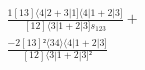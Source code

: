 \documentclass[varwidth, border=5pt]{standalone}
\begin{document}
\begin{my}
$\begin{gathered}
\scriptscriptstyle\frac{1[13]⟨4|2+3|1]⟨4|1+2|3]}{[12]⟨3|1+2|3]s_{123}} +\\
\scriptscriptstyle\frac{-2[13]²⟨34⟩⟨4|1+2|3]}{[12]⟨3|1+2|3]²} \phantom{+}
\end{gathered}$
\end{my}
\end{document}
